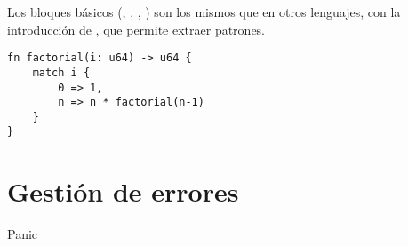 Los bloques básicos (, , , ) son los
mismos que en otros lenguajes, con la introducción de , que permite
extraer patrones.

\begin{verbatim}
fn factorial(i: u64) -> u64 {
    match i {
        0 => 1,
        n => n * factorial(n-1)
    }
}
\end{verbatim}

\section{Gestión de errores}

Panic


\section{}

